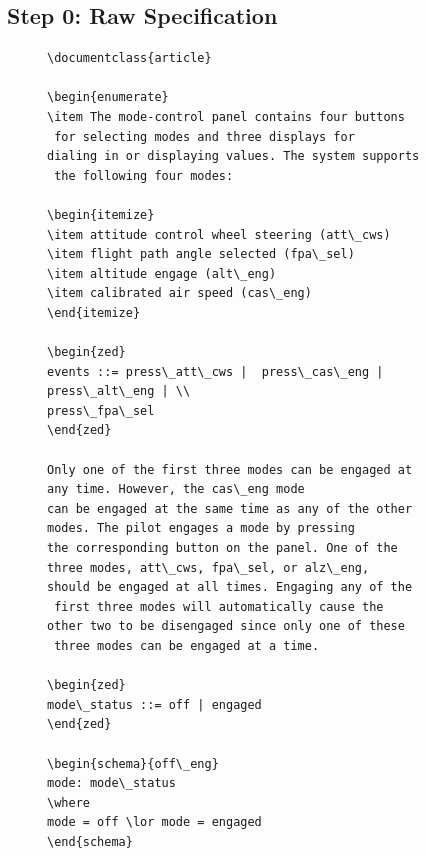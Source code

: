 \subsection{Step 0: Raw Specification}

 \begin{figure}[H]
     \vspace{-0.2in}
     \centering
     \begin{minipage}{0.45\textwidth}
     \centering
     \begin{tiny}
     \begin{BVerbatim}
\documentclass{article}
        
\begin{enumerate}
\item The mode-control panel contains four buttons
 for selecting modes and three displays for
dialing in or displaying values. The system supports
 the following four modes:
           
\begin{itemize}
\item attitude control wheel steering (att\_cws)
\item flight path angle selected (fpa\_sel)
\item altitude engage (alt\_eng)
\item calibrated air speed (cas\_eng)
\end{itemize}
          
\begin{zed}
events ::= press\_att\_cws |  press\_cas\_eng | 
press\_alt\_eng | \\
press\_fpa\_sel
\end{zed}
          
Only one of the first three modes can be engaged at 
any time. However, the cas\_eng mode
can be engaged at the same time as any of the other 
modes. The pilot engages a mode by pressing
the corresponding button on the panel. One of the 
three modes, att\_cws, fpa\_sel, or alz\_eng,
should be engaged at all times. Engaging any of the
 first three modes will automatically cause the
other two to be disengaged since only one of these
 three modes can be engaged at a time.
           
\begin{zed}
mode\_status ::= off | engaged
\end{zed}
      
\begin{schema}{off\_eng}
mode: mode\_status
\where
mode = off \lor mode = engaged
\end{schema}
           

\end{BVerbatim}
\end{tiny}
\end{minipage}
\end{figure}
